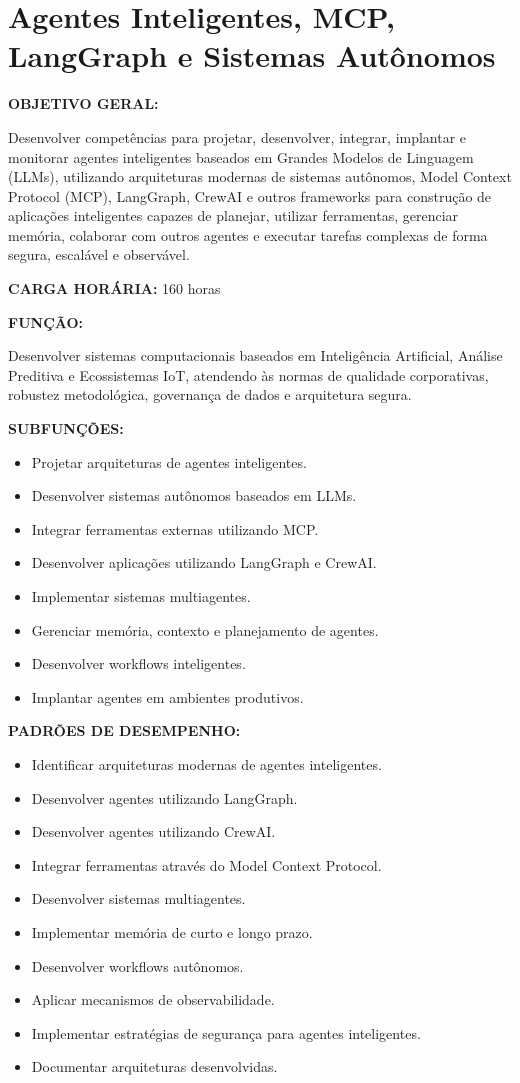 \section{Agentes Inteligentes, MCP, LangGraph e Sistemas Autônomos}

\textbf{OBJETIVO GERAL:}

Desenvolver competências para projetar, desenvolver, integrar, implantar e monitorar agentes inteligentes baseados em Grandes Modelos de Linguagem (LLMs), utilizando arquiteturas modernas de sistemas autônomos, Model Context Protocol (MCP), LangGraph, CrewAI e outros frameworks para construção de aplicações inteligentes capazes de planejar, utilizar ferramentas, gerenciar memória, colaborar com outros agentes e executar tarefas complexas de forma segura, escalável e observável.

\textbf{CARGA HORÁRIA:} 160 horas

\textbf{FUNÇÃO:}

Desenvolver sistemas computacionais baseados em Inteligência Artificial, Análise Preditiva e Ecossistemas IoT, atendendo às normas de qualidade corporativas, robustez metodológica, governança de dados e arquitetura segura.

\textbf{SUBFUNÇÕES:}

\begin{itemize}
\item Projetar arquiteturas de agentes inteligentes.
\item Desenvolver sistemas autônomos baseados em LLMs.
\item Integrar ferramentas externas utilizando MCP.
\item Desenvolver aplicações utilizando LangGraph e CrewAI.
\item Implementar sistemas multiagentes.
\item Gerenciar memória, contexto e planejamento de agentes.
\item Desenvolver workflows inteligentes.
\item Implantar agentes em ambientes produtivos.
\end{itemize}

\textbf{PADRÕES DE DESEMPENHO:}

\begin{itemize}
\item Identificar arquiteturas modernas de agentes inteligentes.
\item Desenvolver agentes utilizando LangGraph.
\item Desenvolver agentes utilizando CrewAI.
\item Integrar ferramentas através do Model Context Protocol.
\item Desenvolver sistemas multiagentes.
\item Implementar memória de curto e longo prazo.
\item Desenvolver workflows autônomos.
\item Aplicar mecanismos de observabilidade.
\item Implementar estratégias de segurança para agentes inteligentes.
\item Documentar arquiteturas desenvolvidas.
\end{itemize}

